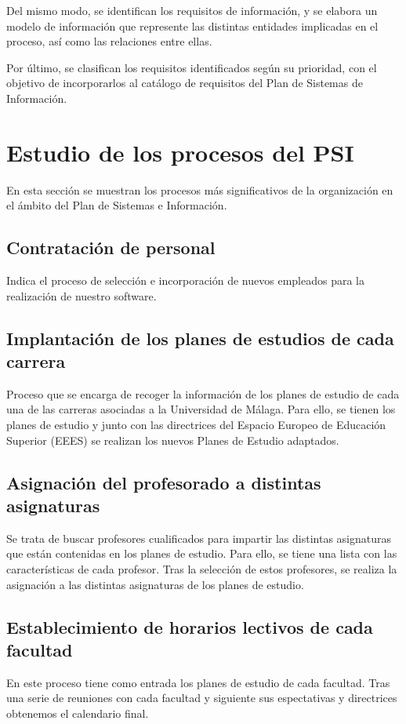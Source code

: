 \documentclass[11pt,a4paper,spanish,twoside]{book}
\begin{document}
Del mismo modo, se identifican los requisitos de información, y
se elabora un modelo de información que represente las distintas entidades
implicadas en el proceso, así como las relaciones entre ellas. 

Por último, se clasifican los requisitos identificados según su prioridad,
con el objetivo de incorporarlos al catálogo de requisitos del Plan de
Sistemas de Información. 

\section{Estudio de los procesos del PSI}
En esta sección se muestran los procesos más significativos de la
organización en el ámbito del Plan de Sistemas e Información.  
\subsection{Contratación de personal}
Indica el proceso de selección e incorporación de nuevos empleados para la
realización de nuestro software.
\subsection{Implantación de los planes de estudios de cada carrera}
Proceso que se encarga de recoger la información de los planes de estudio de
cada una de las carreras asociadas a la Universidad de Málaga. Para ello, se
tienen los planes de estudio y junto con las directrices del Espacio Europeo
de Educación Superior (EEES) se realizan los nuevos Planes de Estudio
adaptados.

\subsection{Asignación del profesorado a distintas asignaturas}
Se trata de buscar profesores cualificados para impartir las distintas
asignaturas que están contenidas en los planes de estudio. Para ello, se
tiene una lista con las características de cada profesor. Tras la selección
de estos profesores, se realiza la asignación a las distintas asignaturas de
los planes de estudio.
 
\subsection{Establecimiento de horarios lectivos de cada facultad}
En este proceso tiene como entrada los planes de estudio de cada
facultad. Tras una serie de reuniones con cada facultad y siguiente sus
espectativas y directrices obtenemos el calendario final.
\end{document}
